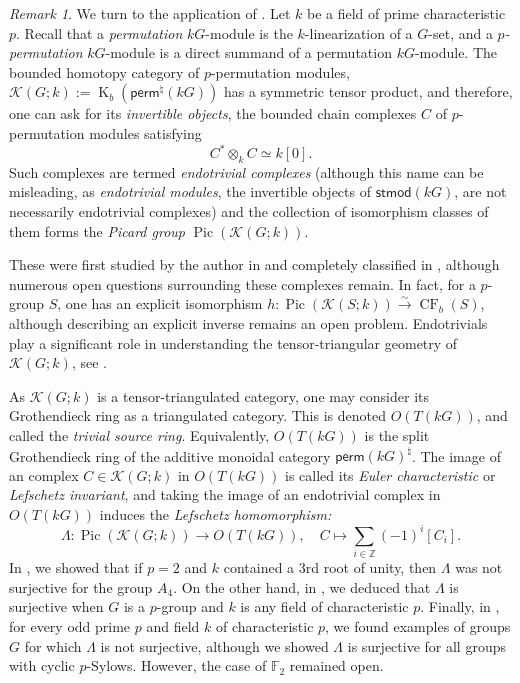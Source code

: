 \documentclass[]{amsart}
\newcommand{\Pic}{\operatorname{Pic}}
\newcommand{\on}[1]{\operatorname{#1}}
\newcommand{\catK}{\mathscr{K}}
\newcommand{\bbF}{\mathbb{F}}
\newcommand{\bbZ}{\mathbb{Z}}
\newcommand{\CF}{\on{CF}}
\theoremstyle{remark}
\newtheorem{remark}[theorem]{Remark}
\theoremstyle{definition}
\begin{document}
	\begin{remark}\label{rmk:endotriv_overview}
		We turn to the application of . Let $k$ be a field of prime characteristic $p$. Recall that a \emph{permutation} $kG$-module is the $k$-linearization of a $G$-set, and a \emph{$p$-permutation} $kG$-module is a direct summand of a permutation $kG$-module. The bounded homotopy category of $p$-permutation modules, $\catK(G;k) := \on{K}_b(\mathsf{perm}^\natural(kG))$ has a symmetric tensor product, and therefore, one can ask for its \emph{invertible objects}, the bounded chain complexes $C$ of $p$-permutation modules satisfying \[C^* \otimes_k C \simeq k[0].\] Such complexes are termed \emph{endotrivial complexes} (although this name can be misleading, as \emph{endotrivial modules}, the invertible objects of $\mathsf{stmod}(kG)$, are not necessarily endotrivial complexes) and the collection of isomorphism classes of them forms the \emph{Picard group} $\Pic(\catK(G;k))$. 
		
		These were first studied by the author in \cite{M24a} and completely classified in \cite{M24c}, although numerous open questions surrounding these complexes remain. In fact, for a $p$-group $S$, one has an explicit isomorphism $h\colon \Pic(\catK(S;k)) \xrightarrow{\sim} \CF_b(S)$, although describing an explicit inverse remains an open problem. Endotrivials play a significant role in understanding the tensor-triangular geometry of $\catK(G;k)$, see \cite{BG25, Mil26}.  
		
		As $\catK(G;k)$ is a tensor-triangulated category, one may consider its Grothendieck ring as a triangulated category. This is denoted $O(T(kG))$, and called the \emph{trivial source ring}. Equivalently, $O(T(kG))$ is the split Grothendieck ring of the additive monoidal category $\mathsf{perm}(kG)^\natural$. The image of an complex $C\in \catK(G;k)$ in $O(T(kG))$ is called its \emph{Euler characteristic} or \emph{Lefschetz invariant}, and taking the image of an endotrivial complex in $O(T(kG))$ induces the \emph{Lefschetz homomorphism:} \[\Lambda\colon \Pic(\catK(G;k)) \to O(T(kG)), \quad C \mapsto \sum_{i \in \bbZ} (-1)^i [C_i].\] In \cite{M24a}, we showed that if $p=2$ and $k$ contained a 3rd root of unity, then $\Lambda$ was not surjective for the group $A_4$. On the other hand, in \cite{M24c}, we deduced that $\Lambda$ is surjective when $G$ is a $p$-group and $k$ is any field of characteristic $p$. Finally, in \cite{MM26}, for every odd prime $p$ and field $k$ of characteristic $p$, we found examples of groups $G$ for which $\Lambda$ is not surjective, although we showed $\Lambda$ is surjective for all groups with cyclic $p$-Sylows. However, the case of $\bbF_2$ remained open. 
	\end{remark}
	
\end{document}
